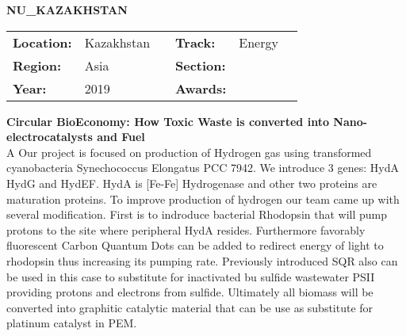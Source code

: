 \textbf{\uppercase{NU\_Kazakhstan}} \FloatBarrier \begin{table}[h] \begin{tabular}{lp{2.5cm}llll} \textbf{Location:} & Kazakhstan & \multicolumn{1}{|l}{} & \textbf{Track:}   & Energy \\ \textbf{Region:}   & Asia   & \multicolumn{1}{|l}{} & \textbf{Section:} &  \\ \textbf{Year:}     & 2019   & \multicolumn{1}{|l}{} & \textbf{Awards:}  & \end{tabular} \end{table} \FloatBarrier \noindent\textbf{Circular BioEconomy: How Toxic Waste is converted into Nano-electrocatalysts and Fuel} \vspace{.2cm}\\ A 
Our project is focused on production of Hydrogen gas using transformed cyanobacteria Synechococcus Elongatus PCC 7942. We introduce 3 genes: HydA HydG and HydEF. HydA is [Fe-Fe] Hydrogenase and other two proteins are maturation proteins. To improve production of hydrogen our team came up with several modification. First is to indroduce bacterial Rhodopsin that will pump protons to the site where peripheral HydA resides. Furthermore favorably fluorescent Carbon Quantum Dots can be added to redirect energy of light to rhodopsin thus increasing its pumping rate. Previously introduced SQR also can be used in this case to substitute for inactivated bu sulfide wastewater PSII providing protons and electrons from sulfide. Ultimately all biomass will be converted into graphitic catalytic material that can be use as substitute for platinum catalyst in PEM.
\vspace{2cm} $ $
\pagebreak

